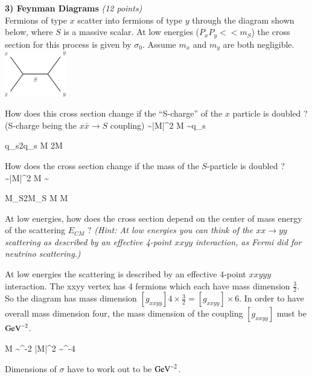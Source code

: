 {\textbf{3) Feynman Diagrams }\hfill \textit{(12 points)}\\
Fermions of type $x$ scatter into fermions of type $y$ through the diagram shown below, where $S$ is a massive scalar. 
At low energies ($P_x P_y << m_S$) the cross section for this process is given by $\sigma_0$.
Assume $m_x$ and $m_y$ are both negligible.
\bc
\includegraphics[width=0.2\textwidth]{./xxToyy.pdf}
\ec
\bi
\item[a)] How does this cross section change if the ``S-charge'' of the $x$ particle is doubled ? \\ (S-charge being the $x\bar{x} \rightarrow S$ coupling) 
\be
\sigma \sim |M|^2 \hspace*{0.5in} M \sim q_s
\ee

\be
q_s\rightarrow 2q_s \Rightarrow M \rightarrow 2M \Rightarrow \sigma {}\sigma
\ee
\item[b)] How does the cross section change if the mass of the $S$-particle is doubled ?
\be
\sigma \sim |M|^2 \hspace*{0.5in} M \sim {}
\ee

\be
M_S\rightarrow 2M_S \Rightarrow M \rightarrow {}M \Rightarrow \sigma \rightarrow {}\sigma
\ee

\item[c)] At low energies, how does the cross section depend on the center of mass energy of the scattering $E_{CM}$ ? 
\textit{(Hint: At low energies you can think of the $xx \rightarrow yy$ scattering as described by an effective 4-point $xxyy$ interaction, as Fermi did for neutrino scattering.)}

At low energies the scattering is described by an effective 4-point $xxyyy$ interaction.
The xxyy vertex has 4 fermions which each have mass dimension $\frac{3}{2}$.  
So the diagram has mass dimension $[g_{xxyy}] 4 \times \frac{3}{2} = [g_{xxyy}] \times 6$. 
In order to have overall mass dimension four, the mass dimension of the coupling $[g_{xxyy}]$ must be $\textrm{GeV}^{-2}$.

\be
M \sim \GeV^{-2} \Rightarrow |M|^2 \sim \GeV^{-4}
\ee

Dimensions of $\sigma$ have to work out to be $\textrm{GeV}^{-2}$.

}
